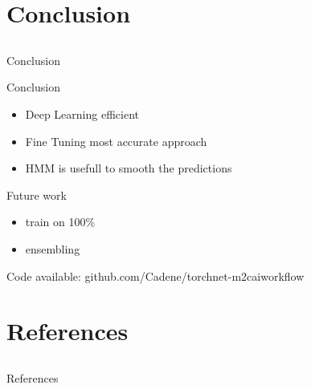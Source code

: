 \section{Conclusion} \subsection{}\label{}

\begin{frame}{Conclusion}

	\begin{block}{Conclusion}
		\begin{itemize}
			\item Deep Learning efficient %
			\item Fine Tuning most accurate approach %
			\item HMM is usefull to smooth the predictions %
		\end{itemize}
	\end{block}
	
	\begin{block}{Future work}
		\begin{itemize}
			\item train on 100\%
			\item ensembling
		\end{itemize}
	\end{block}
	
	Code available: github.com/Cadene/torchnet-m2caiworkflow
	
\end{frame}

\section{References} \subsection{}\label{references}

\begin{frame}[allowframebreaks]{References}
	
	\printbibliography[heading=none]
	
\end{frame}